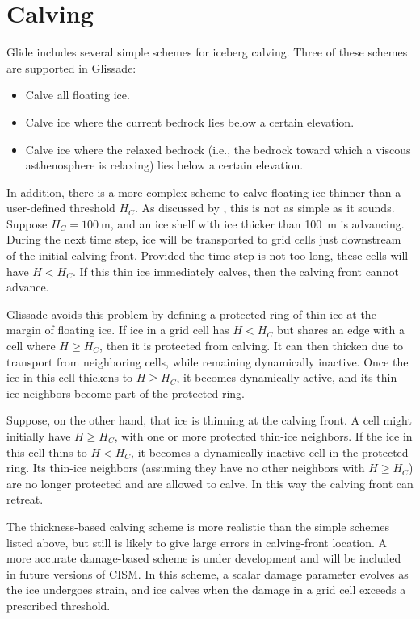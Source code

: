 
\section{Calving}
\label{sc:glissade-calving}

Glide includes several simple schemes for iceberg calving.
Three of these schemes are supported in Glissade:

\begin{itemize}
\item Calve all floating ice.
\item Calve ice where the current bedrock lies below a certain elevation.
\item Calve ice where the relaxed bedrock (i.e., the bedrock toward which
a viscous asthenosphere is relaxing) lies below a certain elevation.
\end{itemize}

In addition, there is a more complex scheme to calve floating ice thinner than a user-defined threshold $H_C$.
As discussed by \citet{Albrecht2011}, this is not as simple as it sounds.
Suppose $H_C = 100 \mathrm{~m}$, and an ice shelf with ice thicker than 100~m is advancing.
During the next time step, ice will be transported to grid cells just downstream of the initial calving front. 
Provided the time step is not too long, these cells will have $H < H_C$.
If this thin ice immediately calves, then the calving front cannot advance.

Glissade avoids this problem by defining a protected ring of thin ice at the margin of floating ice.
If ice in a grid cell has $H < H_C$ but shares an edge with a cell where $H \geq H_C$, then it is protected from calving.
It can then thicken due to transport from neighboring cells, while remaining dynamically inactive. 
Once the ice in this cell thickens to $H \geq H_C$, it becomes dynamically active, 
and its thin-ice neighbors become part of the protected ring.

Suppose, on the other hand, that ice is thinning at the calving front. A cell might initially
have $H \geq H_C$, with one or more protected thin-ice neighbors. If the ice in this cell 
thins to $H < H_C$, it becomes a dynamically inactive cell in the protected ring.  Its thin-ice neighbors 
(assuming they have no other neighbors with $H \geq H_C$) are no longer protected and are allowed to calve.
In this way the calving front can retreat.

The thickness-based calving scheme is more realistic than the simple schemes listed above, but
still is likely to give large errors in calving-front location.
A more accurate damage-based scheme is under development and will be included in future versions of CISM.
In this scheme, a scalar damage parameter evolves as the ice undergoes strain, and ice calves
when the damage in a grid cell exceeds a prescribed threshold.

